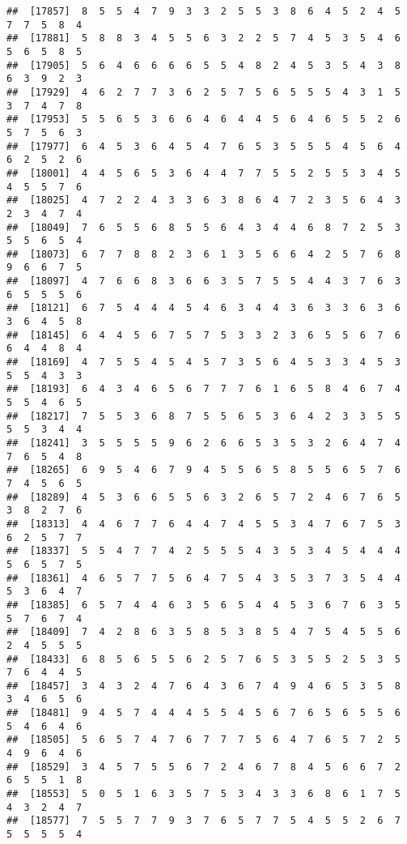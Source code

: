 \documentclass[
]{book}
\begin{document}
\begin{verbatim}
##  [17857]  8  5  5  4  7  9  3  3  2  5  5  3  8  6  4  5  2  4  5  7  7  5  8  4
##  [17881]  5  8  8  3  4  5  5  6  3  2  2  5  7  4  5  3  5  4  6  5  6  5  8  5
##  [17905]  5  6  4  6  6  6  6  5  5  4  8  2  4  5  3  5  4  3  8  6  3  9  2  3
##  [17929]  4  6  2  7  7  3  6  2  5  7  5  6  5  5  5  4  3  1  5  3  7  4  7  8
##  [17953]  5  5  6  5  3  6  6  4  6  4  4  5  6  4  6  5  5  2  6  5  7  5  6  3
##  [17977]  6  4  5  3  6  4  5  4  7  6  5  3  5  5  5  4  5  6  4  6  2  5  2  6
##  [18001]  4  4  5  6  5  3  6  4  4  7  7  5  5  2  5  5  3  4  5  4  5  5  7  6
##  [18025]  4  7  2  2  4  3  3  6  3  8  6  4  7  2  3  5  6  4  3  2  3  4  7  4
##  [18049]  7  6  5  5  6  8  5  5  6  4  3  4  4  6  8  7  2  5  3  5  5  6  5  4
##  [18073]  6  7  7  8  8  2  3  6  1  3  5  6  6  4  2  5  7  6  8  9  6  6  7  5
##  [18097]  4  7  6  6  8  3  6  6  3  5  7  5  5  4  4  3  7  6  3  6  5  5  5  6
##  [18121]  6  7  5  4  4  4  5  4  6  3  4  4  3  6  3  3  6  3  6  3  6  4  5  8
##  [18145]  6  4  4  5  6  7  5  7  5  3  3  2  3  6  5  5  6  7  6  6  4  4  8  4
##  [18169]  4  7  5  5  4  5  4  5  7  3  5  6  4  5  3  3  4  5  3  5  5  4  3  3
##  [18193]  6  4  3  4  6  5  6  7  7  7  6  1  6  5  8  4  6  7  4  5  5  4  6  5
##  [18217]  7  5  5  3  6  8  7  5  5  6  5  3  6  4  2  3  3  5  5  5  5  3  4  4
##  [18241]  3  5  5  5  5  9  6  2  6  6  5  3  5  3  2  6  4  7  4  7  6  5  4  8
##  [18265]  6  9  5  4  6  7  9  4  5  5  6  5  8  5  5  6  5  7  6  7  4  5  6  5
##  [18289]  4  5  3  6  6  5  5  6  3  2  6  5  7  2  4  6  7  6  5  3  8  2  7  6
##  [18313]  4  4  6  7  7  6  4  4  7  4  5  5  3  4  7  6  7  5  3  6  2  5  7  7
##  [18337]  5  5  4  7  7  4  2  5  5  5  4  3  5  3  4  5  4  4  4  5  6  5  7  5
##  [18361]  4  6  5  7  7  5  6  4  7  5  4  3  5  3  7  3  5  4  4  5  3  6  4  7
##  [18385]  6  5  7  4  4  6  3  5  6  5  4  4  5  3  6  7  6  3  5  5  7  6  7  4
##  [18409]  7  4  2  8  6  3  5  8  5  3  8  5  4  7  5  4  5  5  6  2  4  5  5  5
##  [18433]  6  8  5  6  5  5  6  2  5  7  6  5  3  5  5  2  5  3  5  7  6  4  4  5
##  [18457]  3  4  3  2  4  7  6  4  3  6  7  4  9  4  6  5  3  5  8  3  4  6  5  6
##  [18481]  9  4  5  7  4  4  4  5  5  4  5  6  7  6  5  6  5  5  6  5  4  6  4  6
##  [18505]  5  6  5  7  4  7  6  7  7  7  5  6  4  7  6  5  7  2  5  4  9  6  4  6
##  [18529]  3  4  5  7  5  5  6  7  2  4  6  7  8  4  5  6  6  7  2  6  5  5  1  8
##  [18553]  5  0  5  1  6  3  5  7  5  3  4  3  3  6  8  6  1  7  5  4  3  2  4  7
##  [18577]  7  5  5  7  7  9  3  7  6  5  7  7  5  4  5  5  2  6  7  5  5  5  5  4

\end{verbatim}
\end{document}

